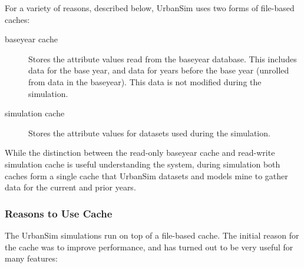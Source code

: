For a variety of reasons, described below, UrbanSim uses two forms of file-based
caches:
\begin{description}
\item[baseyear cache]
Stores the attribute values read from the baseyear
database.  This includes data for the base year, and data for years before the
base year (unrolled from data in the baseyear).  This data is not modified
during the simulation.

\item[simulation cache] \simulationcacheindex
Stores the attribute values for datasets used during the simulation.
\end{description}
While the distinction between the read-only baseyear cache and read-write
simulation cache \simulationcacheindex is useful understanding the system, during simulation both
caches form a single cache that UrbanSim datasets and models mine to gather data
for the current and prior years.

\subsubsection{Reasons to Use Cache}
The UrbanSim simulations run on top of a file-based cache.  The initial reason
for the cache was to improve performance, and has turned out to be very useful for
many features:

